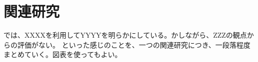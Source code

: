 \documentclass[main]{subfiles}
\begin{document}
\chapter{関連研究}
\label{cha:related}

\cite{Athuraliya01:Emprical} では、XXXXを利用してYYYYを明らかにしている。かしながら、ZZZの観点からの評価がない。
といった感じのことを、一つの関連研究につき、一段落程度まとめていく。図表を使ってもよい。
\end{document}
